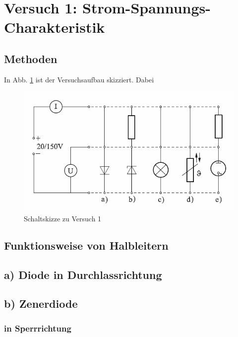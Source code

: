 \documentclass[11pt,a4paper,titlepage, ngerman]{article}
\begin{document}
	\section{Versuch 1: Strom-Spannungs-Charakteristik}
		
		\subsection{Methoden} %
		
		In Abb. \ref{Schaltskizze1} ist der Versuchsaufbau skizziert. Dabei
		
		\begin{figure}
			\includegraphics[width=\textwidth]{Versuch1.png}
			\caption{Schaltskizze zu Versuch 1}
			\label{Schaltskizze1}
		\end{figure}
		
		\subsection{Funktionsweise von Halbleitern}
		
		\subsection{a) Diode in Durchlassrichtung} %

		\subsection{b) Zenerdiode} %
		
			\subsubsection{in Sperrrichtung}
			
\end{document}
